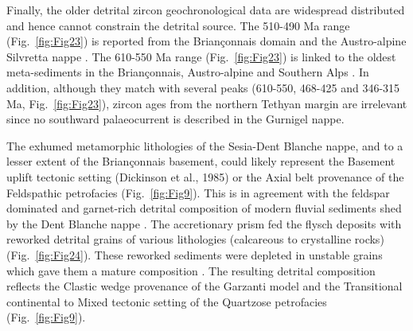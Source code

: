 \documentclass[twoside]{article}
\begin{document}
Finally, the older detrital zircon geochronological data are widespread distributed and hence cannot constrain the detrital source. The 510-490 Ma range (Fig.~\ref{fig:Fig23}) is reported from the Briançonnais domain and the Austro-alpine Silvretta nappe \citep{Schaltegger1999}. The 610-550 Ma range (Fig.~\ref{fig:Fig23}) is linked to the oldest meta-sediments in the Briançonnais, Austro-alpine and Southern Alps \citep{Schaltegger1999}. In addition, although they match with several peaks (610-550, 468-425 and 346-315 Ma, Fig.~\ref{fig:Fig23}), zircon ages from the northern Tethyan margin are irrelevant since no southward palaeocurrent is described in the Gurnigel nappe.\par
\medskip
The exhumed metamorphic lithologies of the Sesia-Dent Blanche nappe, and to a lesser extent of the Briançonnais basement, could likely represent the Basement uplift tectonic setting (Dickinson et al., 1985) or the Axial belt provenance \citep{Garzanti2004,Garzanti2007b,Garzanti2010} of the Feldspathic petrofacies (Fig.~\ref{fig:Fig9}). This is in agreement with the feldspar dominated and garnet-rich detrital composition of modern fluvial sediments shed by the Dent Blanche nappe \citep{Garzanti2010}. The accretionary prism fed the flysch deposits with reworked detrital grains of various lithologies (calcareous to crystalline rocks) (Fig.~\ref{fig:Fig24}). These reworked sediments were depleted in unstable grains which gave them a mature composition \citep{Velbel1985}. The resulting detrital composition reflects the Clastic wedge provenance of the Garzanti model \citep{Garzanti2007b} and the Transitional continental to Mixed tectonic setting \citep{Dickinson1985} of the Quartzose petrofacies (Fig.~\ref{fig:Fig9}).\par
\medskip

\end{document}
